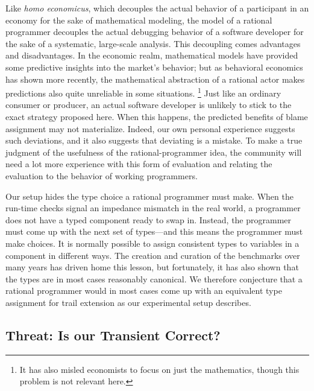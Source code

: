 Like {\em homo economicus\/}, which decouples the actual behavior of a
participant in an economy for the sake of mathematical modeling, the model of a
rational programmer decouples the actual debugging behavior of a software
developer for the sake of a systematic, large-scale analysis. This decoupling
comes advantages and disadvantages. In the economic realm, mathematical models
have provided some predictive insights into the market's behavior; but as
behavioral economics has shown more recently, the mathematical abstraction of a
rational actor makes predictions also quite unreliable in some situations.
\footnote{It has also misled economists to focus on just the mathematics, though
this problem is not relevant here.}  Just like an ordinary consumer or producer,
an actual software developer is unlikely to stick to the exact strategy proposed
here. When this happens, the predicted benefits of blame assignment may not
materialize. Indeed, our own personal experience suggests such deviations, and
it also suggests that deviating is a mistake. To make a true judgment of the
usefulness of the rational-programmer idea, the community will need a lot more
experience with this form of evaluation and relating the evaluation to the
behavior of working programmers.

Our setup hides the type choice a rational programmer must make. When the
run-time checks signal an impedance mismatch in the real world, a programmer
does not have a typed component ready to swap in. Instead, the programmer must
come up with the next set of types---and this means the programmer must make
choices. It is normally possible to assign consistent types to variables in a
component in different ways. The creation and curation of the benchmarks over
many years has driven home this lesson, but fortunately, it has also shown that
the types are in most cases reasonably canonical.  We therefore conjecture that
a rational programmer would in most cases come up with an equivalent type
assignment for trail extension as our experimental setup describes.


\subsection{Threat: Is our Transient Correct?}

